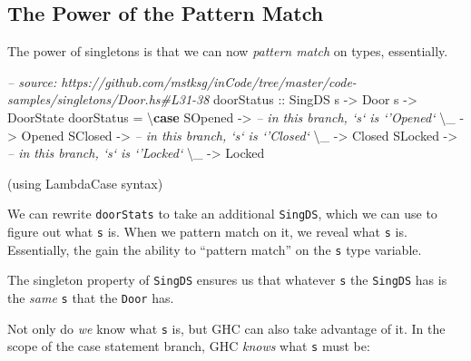 \documentclass[]{article}
\newenvironment{Shaded}{}{}
\newcommand{\KeywordTok}[1]{\textcolor[rgb]{0.00,0.44,0.13}{\textbf{#1}}}
\newcommand{\DataTypeTok}[1]{\textcolor[rgb]{0.56,0.13,0.00}{#1}}
\newcommand{\CommentTok}[1]{\textcolor[rgb]{0.38,0.63,0.69}{\textit{#1}}}
\newcommand{\OtherTok}[1]{\textcolor[rgb]{0.00,0.44,0.13}{#1}}
\newcommand{\FunctionTok}[1]{\textcolor[rgb]{0.02,0.16,0.49}{#1}}
\newcommand{\NormalTok}[1]{#1}
\begin{document}
\subsection{The Power of the Pattern
Match}\label{the-power-of-the-pattern-match}

The power of singletons is that we can now \emph{pattern match} on types,
essentially.

\begin{Shaded}
\begin{Highlighting}[]
\CommentTok{-- source: https://github.com/mstksg/inCode/tree/master/code-samples/singletons/Door.hs#L31-38}
\OtherTok{doorStatus ::} \DataTypeTok{SingDS}\NormalTok{ s }\OtherTok{->} \DataTypeTok{Door}\NormalTok{ s }\OtherTok{->} \DataTypeTok{DoorState}
\NormalTok{doorStatus }\FunctionTok{=}\NormalTok{ \textbackslash{}}\KeywordTok{case}
    \DataTypeTok{SOpened} \OtherTok{->} \CommentTok{-- in this branch, `s` is `'Opened`}
\NormalTok{        \textbackslash{}_ }\OtherTok{->} \DataTypeTok{Opened}
    \DataTypeTok{SClosed} \OtherTok{->} \CommentTok{-- in this branch, `s` is `'Closed`}
\NormalTok{        \textbackslash{}_ }\OtherTok{->} \DataTypeTok{Closed}
    \DataTypeTok{SLocked} \OtherTok{->} \CommentTok{-- in this branch, `s` is `'Locked`}
\NormalTok{        \textbackslash{}_ }\OtherTok{->} \DataTypeTok{Locked}
\end{Highlighting}
\end{Shaded}

(using LambdaCase syntax)

We can rewrite \texttt{doorStats} to take an additional \texttt{SingDS}, which
we can use to figure out what \texttt{s} is. When we pattern match on it, we
reveal what \texttt{s} is. Essentially, the gain the ability to ``pattern
match'' on the \texttt{s} type variable.

The singleton property of \texttt{SingDS} ensures us that whatever \texttt{s}
the \texttt{SingDS} has is the \emph{same} \texttt{s} that the \texttt{Door}
has.

Not only do \emph{we} know what \texttt{s} is, but GHC can also take advantage
of it. In the scope of the case statement branch, GHC \emph{knows} what
\texttt{s} must be:
\end{document}
